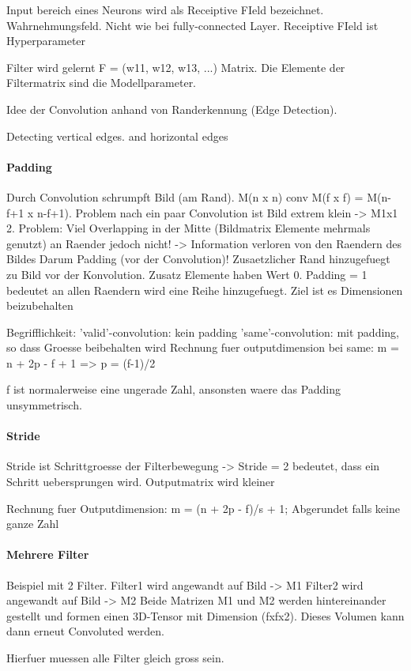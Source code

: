 \documentclass[../main]{subfiles}
\begin{document}
Input bereich eines Neurons wird als Receiptive FIeld bezeichnet.
Wahrnehmungsfeld. Nicht wie bei fully-connected Layer. Receiptive FIeld ist Hyperparameter

Filter wird gelernt F = (w11, w12, w13, ...) Matrix. Die Elemente der
Filtermatrix sind die Modellparameter.

Idee der Convolution anhand von Randerkennung (Edge Detection).

Detecting vertical edges. and horizontal edges


\paragraph{Padding}
Durch Convolution schrumpft Bild (am Rand). M(n x n) conv M(f x f) = M(n-f+1 x
n-f+1).
Problem nach ein paar Convolution ist Bild extrem klein -> M1x1
2. Problem: Viel Overlapping in der Mitte (Bildmatrix Elemente mehrmals genutzt)
an Raender jedoch nicht! -> Information verloren von den Raendern des Bildes
Darum Padding (vor der Convolution)! Zusaetzlicher Rand hinzugefuegt zu Bild vor
der Konvolution. Zusatz Elemente haben Wert 0. Padding = 1 bedeutet an allen
Raendern wird eine Reihe hinzugefuegt. Ziel ist es Dimensionen beizubehalten

Begrifflichkeit:
'valid'-convolution: kein padding
'same'-convolution: mit padding, so dass Groesse beibehalten wird
Rechnung fuer outputdimension bei same: m = n + 2p - f + 1 => p = (f-1)/2

f ist normalerweise eine ungerade Zahl, ansonsten waere das Padding unsymmetrisch.
\paragraph{Stride}
Stride ist Schrittgroesse der Filterbewegung
-> Stride = 2 bedeutet, dass ein Schritt uebersprungen wird.
Outputmatrix wird kleiner

Rechnung fuer Outputdimension:
m = (n + 2p - f)/s + 1; Abgerundet falls keine ganze Zahl

\paragraph{Mehrere Filter}
Beispiel mit 2 Filter.
Filter1 wird angewandt auf Bild -> M1
Filter2 wird angewandt auf Bild -> M2
Beide Matrizen M1 und M2 werden hintereinander gestellt und formen einen
3D-Tensor mit Dimension (fxfx2). Dieses Volumen kann dann erneut Convoluted werden.

Hierfuer muessen alle Filter gleich gross sein.
\end{document}
